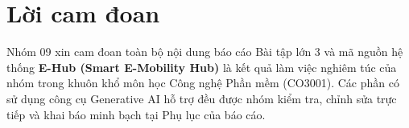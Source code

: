 \section*{Lời cam đoan}

Nhóm 09 xin cam đoan toàn bộ nội dung báo cáo Bài tập lớn 3 và mã nguồn hệ thống \textbf{E-Hub (Smart E-Mobility Hub)} là kết quả làm việc nghiêm túc của nhóm trong khuôn khổ môn học Công nghệ Phần mềm (CO3001). Các phần có sử dụng công cụ Generative AI hỗ trợ đều được nhóm kiểm tra, chỉnh sửa trực tiếp và khai báo minh bạch tại Phụ lục của báo cáo.

\newpage
